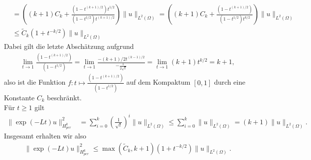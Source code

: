 \begin{solution}
\begin{enumerate}[label = (\roman*)]
\begin{align*}
    &= \left((k+1)C_k + \frac{(1- t^{(k+1)/2})t^{1/2}}{(1-t^{1/2})t^{(k+1)/2}}\right)\|u\|_{L^2(\Omega)}
    = \left( (k+1)C_k + \frac{(1- t^{(k+1)/2})}{(1-t^{1/2})t^{k/2}}\right)\|u\|_{L^2(\Omega)} \\
    &\leq \tilde{C}_k(1 + t^{-k/2})\|u\|_{L^2(\Omega)}
  \end{align*}
  Dabei gilt die letzte Abschätzung aufgrund
  \begin{align*}
    \lim_{t \to 1 } \frac{(1- t^{(k+1)/2})}{(1-t^{1/2})} =
    \lim_{t \to 1 }\frac{-(k+1)/2t^{(k-1)/2}}{-\frac{1}{2\sqrt{t}}} = \lim_{t\to 1}(k+1)t^{k/2} =
    k + 1,
  \end{align*}
  also ist die Funktion $f: t \mapsto \frac{(1- t^{(k+1)/2})}{(1-t^{1/2})}$
  auf dem Kompaktum $[0,1]$ durch eine Konstante $C_k$ beschränkt. \\
  Für $t \geq 1$ gilt
  \begin{align*}
    \|\exp(-Lt)u\|_{H_{per}^k}^2 &= \sum_{i=0}^k \left(\frac{1}{\sqrt{t}}\right)^i \|u\|_{L^2(\Omega)}
    \leq \sum_{i=0}^k \|u\|_{L^2(\Omega)} = (k + 1)\|u\|_{L^2(\Omega)}.
  \end{align*}
  Insgesamt erhalten wir also
  \begin{align*}
    \|\exp(-Lt)u\|_{H_{per}^k}^2 \leq \max(\tilde{C}_k, k + 1)(1 + t^{-k/2})\|u\|_{L^2(\Omega)}.
  \end{align*}
\end{enumerate}

\end{solution}

